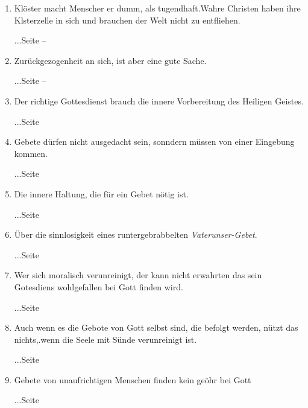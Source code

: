 \begin{enumerate}
 \item Klöster macht Menscher er dumm, als tugendhaft.Wahre Christen haben ihre
Klsterzelle in sich und brauchen der Welt nicht zu entfliehen.
 \begin{flushright}...Seite \pageref{ref:05_11_kloster} --
\pageref{ref:05_11_kloster_ende}\end{flushright}
 \item Zurückgezogenheit an sich, ist aber eine gute Sache.
 \begin{flushright}...Seite \pageref{ref:05_13_zurueckgezogenheit} --
\pageref{ref:05_13_zurueckgezogenheit_ende}\end{flushright}
 \item Der richtige Gottesdienst brauch die innere Vorbereitung des Heiligen
Geistes.
 \begin{flushright}...Seite
\pageref{ref:06_03_gottesdiensvorbereitung}\end{flushright}
 \item Gebete dürfen nicht ausgedacht sein, sonndern müssen von einer Eingebung
kommen.
 \begin{flushright}...Seite \pageref{ref:06_04_gebet}\end{flushright}
 \item Die innere Haltung, die für ein Gebet nötig ist.
 \begin{flushright}...Seite \pageref{ref:06_04_gebetshaltung}\end{flushright}
 \item Über die sinnlosigkeit eines runtergebrabbelten
\textit{Vaterunser-Gebet}.
 \begin{flushright}...Seite \pageref{ref:06_07_sinnlose_gebete}\end{flushright}
 \item Wer sich moralisch verunreinigt, der kann nicht erwahrten das sein
Gotesdiens wohlgefallen bei Gott finden wird.
 \begin{flushright}...Seite
\pageref{ref:06_08_moralisch_verunreinigt}\end{flushright}
 \item Auch wenn es die Gebote von Gott selbst sind, die befolgt werden, nützt
das nichts,.wenn die Seele mit Sünde verunreinigt ist.
 \begin{flushright}...Seite \pageref{ref:06_09_gottesregeln}\end{flushright}
 \item Gebete von unaufrichtigen Menschen finden kein geöhr bei Gott
 \begin{flushright}...Seite \pageref{ref:06_09_gebetserhoerung}\end{flushright}

\end{enumerate}
